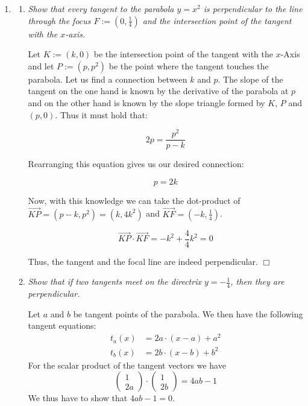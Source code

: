 \documentclass[a4paper,11pt,notitlepage,fullpage]{paper}
\theoremstyle{plain}
\theoremstyle{definition}
\begin{document}
\begin{enumerate}

\item
\begin{enumerate}
\item \emph{Show that every tangent to the parabola $y=x^2$ is perpendicular to the line through the focus $F := (0, \frac{1}{4})$ and the intersection point of the tangent with the $x$-axis.}

Let $K := (k, 0)$ be the intersection point of the tangent with the $x$-Axis and let $P := (p, p^2)$ be the point where the  tangent touches the parabola. Let us find a connection between $k$ and $p$. The slope of the tangent on the one hand is known by the derivative of the parabola at $p$ and on the other hand is known by the slope triangle formed by $K$, $P$ and $(p,0)$. Thus it must hold that:

\begin{equation*}
2p = \frac{p^2}{p-k}
\end{equation*}

Rearranging this equation gives us our desired connection:

\begin{equation*}
p = 2k
\end{equation*}

Now, with this knowledge we can take the dot-product of $\overrightarrow{KP} = (p-k, p^2) = (k, 4k^2)$ and $\overrightarrow{KF} = (-k, \frac{1}{4})$.

\begin{equation*}
\overrightarrow{KP} \cdot \overrightarrow{KF} = -k^2 + \frac{4}{4}k^2 = 0
\end{equation*}

Thus, the tangent and the focal line are indeed perpendicular. \hfill $\Box$

\item \emph{Show that if two tangents meet on the directrix $y = -\frac{1}{4}$, then they are perpendicular.}

Let $a$ and $b$ be tangent points of the parabola. We then have the following tangent equations:
\begin{align*}
	t_a(x)&=2a\cdot (x-a)+a^2\\
	t_b(x)&=2b\cdot (x-b)+b^2
\end{align*}
For the scalar product of the tangent vectors we have
\begin{equation*}
\begin{pmatrix}
1 \\ 2a\end{pmatrix} \cdot \begin{pmatrix} 1 \\ 2b\end{pmatrix}=4ab-1
\end{equation*}
We thus have to show that $4ab-1=0$.


\end{enumerate}
\end{enumerate}
\end{document}
